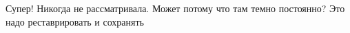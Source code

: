  
 
 
 
 

\qqSecCmt


Супер! Никогда не рассматривала. Может потому что там темно постоянно? Это надо
реставрировать и сохранять
